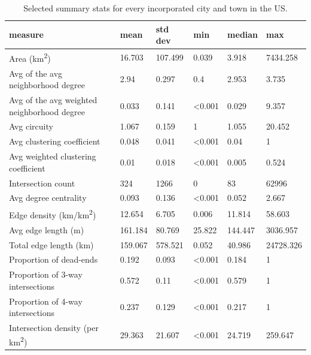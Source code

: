 \documentclass{article}
\begin{document}
\begin{table}
\centering
\caption{Selected summary stats for every incorporated city and town in the US.}
\label{table03}
\begin{tabular}{llllll}
	\toprule
	measure                                     & mean    & std dev & min            & median         & max       \\
	\midrule
	Area (km\textsuperscript{2})                                  & 16.703  & 107.499 & 0.039          & 3.918          & 7434.258  \\
	Avg of the avg neighborhood degree          & 2.94    & 0.297   & 0.4            & 2.953          & 3.735     \\
	Avg of the avg weighted neighborhood degree & 0.033   & 0.141   & \textless0.001 & 0.029          & 9.357     \\
	Avg circuity                                & 1.067   & 0.159   & 1              & 1.055          & 20.452    \\
	Avg clustering coefficient                  & 0.048   & 0.041   & \textless0.001 & 0.04           & 1         \\
	Avg weighted clustering coefficient         & 0.01    & 0.018   & \textless0.001 & 0.005          & 0.524     \\
	Intersection count                          & 324     & 1266    & 0              & 83             & 62996     \\
	Avg degree centrality                       & 0.093   & 0.136   & \textless0.001 & 0.052          & 2.667     \\
	Edge density (km/km\textsuperscript{2})                       & 12.654  & 6.705   & 0.006          & 11.814         & 58.603    \\
	Avg edge length (m)                         & 161.184 & 80.769  & 25.822         & 144.447        & 3036.957  \\
	Total edge length (km)                      & 159.067 & 578.521 & 0.052          & 40.986         & 24728.326 \\
	Proportion of dead-ends                     & 0.192   & 0.093   & \textless0.001 & 0.184          & 1         \\
	Proportion of 3-way intersections           & 0.572   & 0.11    & \textless0.001 & 0.579          & 1         \\
	Proportion of 4-way intersections           & 0.237   & 0.129   & \textless0.001 & 0.217          & 1         \\
	Intersection density (per km\textsuperscript{2})              & 29.363  & 21.607  & \textless0.001 & 24.719         & 259.647   \\

\end{tabular}
\end{table}
\end{document}
